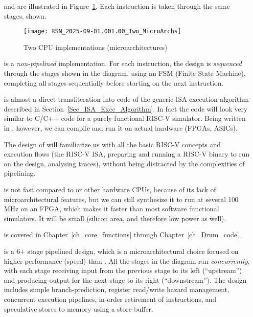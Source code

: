 {\DRUM} and {\FIFE} are illustrated in
Figure~\ref{Fig_Two_Microarchitectures}.  Each instruction is taken
through the same stages, shown.
\begin{figure}[htbp]
  \centerline{\texttt{[image: RSN\_2025-09-01.001.00\_Two\_MicroArchs]}}
  \caption{\label{Fig_Two_Microarchitectures}Two CPU implementations (microarchitectures)}
\end{figure}

{\DRUM} is a \emph{non-pipelined} implementation.  For each instruction,
the design is \emph{sequenced} through the stages shown in the
diagram, using an FSM (Finite State Machine), completing all stages
sequentially before starting on the next instruction.

{\DRUM} is almost a direct transliteration into {\BSV} code of the generic
ISA execution algorithm described in
Section~\ref{Sec_ISA_Exec_Algorithm}.  In fact the {\BSV} code will look
very similar to C/C++ code for a purely functional RISC-V simulator.
Being written in {\BSV}, however, we can compile and run it on actual
hardware (FPGAs, ASICs).
       
The design of {\DRUM} will familiarize us with all the basic RISC-V
concepts and execution flows (the RISC-V ISA, preparing and running a
RISC-V binary to run on the design, analysing traces), without being
distracted by the complexities of pipelining.

{\DRUM} is not fast compared to {\FIFE} or other hardware CPUs, because of
its lack of microarchitectural features, but we can still synthesize
it to run at several 100 MHz on an FPGA, which makes it faster than
most software functional simulators.  It will be small (silicon area,
and therefore low power as well).

{\DRUM} is covered in Chapter~\ref{ch_core_functions} through
Chapter~\ref{ch_Drum_code}.

{\FIFE} is a 6+ stage pipelined design, which is a microarchitectural
choice focused on higher performance (speed) than {\DRUM}.  All the
stages in the diagram run \emph{concurrently}, with each stage
receiving input from the previous stage to its left (``upstream'') and
producing output for the next stage to its right (``downstream'').
The design includes simple branch-prediction, register read/write
hazard management, concurrent execution pipelines, in-order retirement
of instructions, and speculative stores to memory using a
store-buffer.

